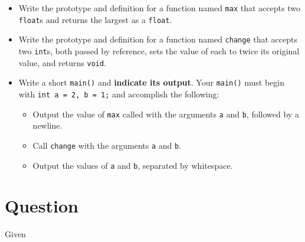 \begin{itemize}

  \item Write the prototype and definition for a function named
    \texttt{max} that accepts two \texttt{float}s and returns
    the largest as a \texttt{float}.
    \vfill

  \item Write the prototype and definition for a function named
    \texttt{change} that accepts two \texttt{int}s, both
    passed by reference, sets the value of each to twice its original value,
    and returns \texttt{void}.
    \vfill

  \item Write a short \texttt{main()} and \textbf{indicate its
    output}.  Your \texttt{main()} must begin with
    \texttt{int a = 2, b = 1;} and accomplish the following:
    \begin{itemize}
      \item Output the value of \texttt{max} called with the arguments
        \texttt{a} and \texttt{b}, followed by a newline.
      \item Call \texttt{change} with the arguments
        \texttt{a}  and \texttt{b}.
      \item Output the values of \texttt{a} and \texttt{b},
        separated by whitespace.
    \end{itemize}
    \vfill

\end{itemize}


\newEvenPage

\section{Question}


Given

\inputminted[label={file-io-input.txt}]{text}{\docCodeDir/file-io-input.txt}

